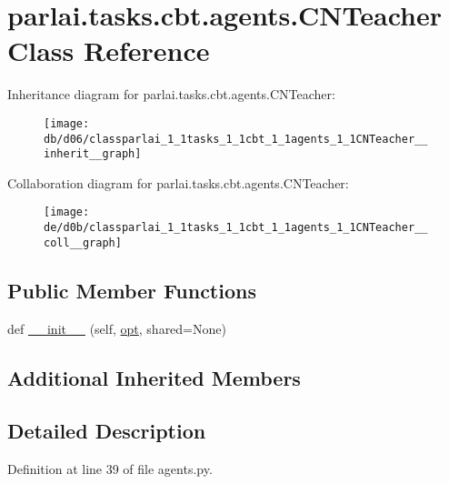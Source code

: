 \hypertarget{classparlai_1_1tasks_1_1cbt_1_1agents_1_1CNTeacher}{}\section{parlai.\+tasks.\+cbt.\+agents.\+C\+N\+Teacher Class Reference}
\label{classparlai_1_1tasks_1_1cbt_1_1agents_1_1CNTeacher}


Inheritance diagram for parlai.\+tasks.\+cbt.\+agents.\+C\+N\+Teacher\+:\nopagebreak
\begin{figure}[H]
\begin{center}
\leavevmode
\texttt{[image: db/d06/classparlai\_1\_1tasks\_1\_1cbt\_1\_1agents\_1\_1CNTeacher\_\_inherit\_\_graph]}
\end{center}
\end{figure}


Collaboration diagram for parlai.\+tasks.\+cbt.\+agents.\+C\+N\+Teacher\+:\nopagebreak
\begin{figure}[H]
\begin{center}
\leavevmode
\texttt{[image: de/d0b/classparlai\_1\_1tasks\_1\_1cbt\_1\_1agents\_1\_1CNTeacher\_\_coll\_\_graph]}
\end{center}
\end{figure}
\subsection*{Public Member Functions}
\begin{DoxyCompactItemize}
\item 
def \hyperlink{classparlai_1_1tasks_1_1cbt_1_1agents_1_1CNTeacher_a68b96e17407acfb0c7583b2da47a1f51}{\+\_\+\+\_\+init\+\_\+\+\_\+} (self, \hyperlink{classparlai_1_1core_1_1teachers_1_1FbDialogTeacher_af7a9ec497b9cd0292d7b8fa220da7c28}{opt}, shared=None)
\end{DoxyCompactItemize}
\subsection*{Additional Inherited Members}


\subsection{Detailed Description}


Definition at line 39 of file agents.\+py.



